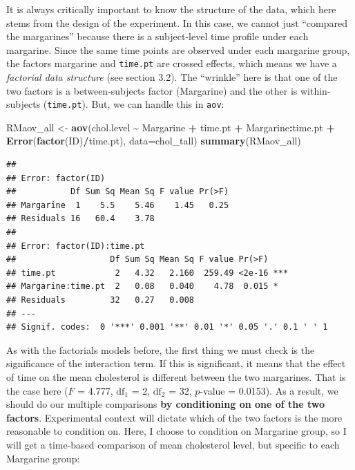 \documentclass[
]{book}
\newenvironment{Shaded}{\begin{snugshade}}{\end{snugshade}}
\newcommand{\AttributeTok}[1]{\textcolor[rgb]{0.13,0.29,0.53}{#1}}
\newcommand{\FunctionTok}[1]{\textcolor[rgb]{0.13,0.29,0.53}{\textbf{#1}}}
\newcommand{\NormalTok}[1]{#1}
\newcommand{\OtherTok}[1]{\textcolor[rgb]{0.56,0.35,0.01}{#1}}
\newcommand{\SpecialCharTok}[1]{\textcolor[rgb]{0.81,0.36,0.00}{\textbf{#1}}}
\begin{document}
It is always critically important to know the structure of the data, which here stems from the design of the experiment. In this case, we cannot just ``compared the margarines'' because there is a subject-level time profile under each margarine. Since the same time points are observed under each margarine group, the factors margarine and \texttt{time.pt} are crossed effects, which means we have a \emph{factorial data structure} (see section 3.2). The ``wrinkle'' here is that one of the two factors is a between-subjects factor (Margarine) and the other is within-subjects (\texttt{time.pt}). But, we can handle this in \texttt{aov}:

\begin{Shaded}
\begin{Highlighting}[]
\NormalTok{RMaov\_all }\OtherTok{\textless{}{-}} \FunctionTok{aov}\NormalTok{(chol.level }\SpecialCharTok{\textasciitilde{}}\NormalTok{ Margarine }\SpecialCharTok{+}\NormalTok{ time.pt }\SpecialCharTok{+}\NormalTok{ Margarine}\SpecialCharTok{:}\NormalTok{time.pt }\SpecialCharTok{+} 
                              \FunctionTok{Error}\NormalTok{(}\FunctionTok{factor}\NormalTok{(ID)}\SpecialCharTok{/}\NormalTok{time.pt), }\AttributeTok{data=}\NormalTok{chol\_tall)}
\FunctionTok{summary}\NormalTok{(RMaov\_all)}
\end{Highlighting}
\end{Shaded}

\begin{verbatim}
## 
## Error: factor(ID)
##           Df Sum Sq Mean Sq F value Pr(>F)
## Margarine  1    5.5    5.46    1.45   0.25
## Residuals 16   60.4    3.78               
## 
## Error: factor(ID):time.pt
##                   Df Sum Sq Mean Sq F value Pr(>F)    
## time.pt            2   4.32   2.160  259.49 <2e-16 ***
## Margarine:time.pt  2   0.08   0.040    4.78  0.015 *  
## Residuals         32   0.27   0.008                   
## ---
## Signif. codes:  0 '***' 0.001 '**' 0.01 '*' 0.05 '.' 0.1 ' ' 1
\end{verbatim}

As with the factorials models before, the first thing we must check is the significance of the interaction term. If this is significant, it means that the effect of time on the mean cholesterol is different between the two margarines. That is the case here (\(F\) = 4.777, \(\textrm{df}_1\) = 2, \(\textrm{df}_2\) = 32, \(p\)-value = 0.0153). As a result, we should do our multiple comparisons \textbf{by conditioning on one of the two factors}. Experimental context will dictate which of the two factors is the more reasonable to condition on. Here, I choose to condition on Margarine group, so I will get a time-based comparison of mean cholesterol level, but specific to each Margarine group:
\end{document}
